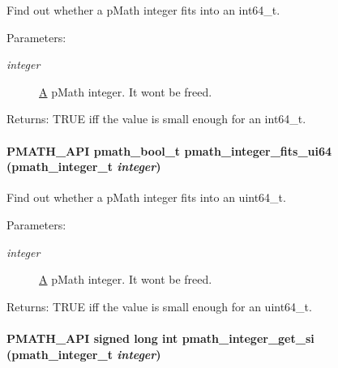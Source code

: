 Find out whether a pMath integer fits into an int64\_\-t. 

\begin{Desc}
\item[Parameters:]
\begin{description}
\item[{\em integer}]\hyperlink{class_a}{A} pMath integer. It wont be freed. \end{description}
\end{Desc}
\begin{Desc}
\item[Returns:]TRUE iff the value is small enough for an int64\_\-t. \end{Desc}
\hypertarget{group__numbers_gc783aa678e68ed2f877ccdb0ea8cca7d}{
\paragraph[{pmath\_\-integer\_\-fits\_\-ui64}]{\setlength{\rightskip}{0pt plus 5cm}PMATH\_\-API {\bf pmath\_\-bool\_\-t} pmath\_\-integer\_\-fits\_\-ui64 ({\bf pmath\_\-integer\_\-t} {\em integer})}\hfill}
\label{group__numbers_gc783aa678e68ed2f877ccdb0ea8cca7d}


Find out whether a pMath integer fits into an uint64\_\-t. 

\begin{Desc}
\item[Parameters:]
\begin{description}
\item[{\em integer}]\hyperlink{class_a}{A} pMath integer. It wont be freed. \end{description}
\end{Desc}
\begin{Desc}
\item[Returns:]TRUE iff the value is small enough for an uint64\_\-t. \end{Desc}
\hypertarget{group__numbers_g12219f6f678ed0ddff66d352e0dabbd1}{
\paragraph[{pmath\_\-integer\_\-get\_\-si}]{\setlength{\rightskip}{0pt plus 5cm}PMATH\_\-API signed long int pmath\_\-integer\_\-get\_\-si ({\bf pmath\_\-integer\_\-t} {\em integer})}\hfill}
\label{group__numbers_g12219f6f678ed0ddff66d352e0dabbd1}


